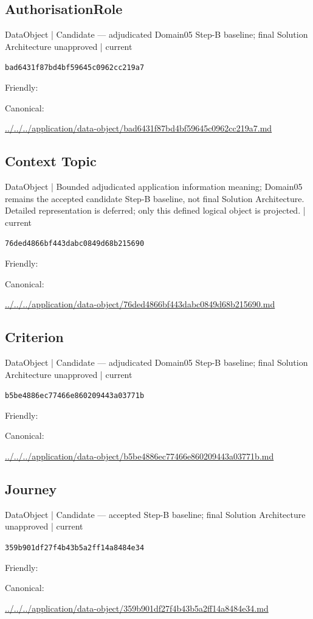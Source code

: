 \documentclass[10pt,a4paper]{article}
\begin{document}
\subsection*{AuthorisationRole}
{\small DataObject | Candidate — adjudicated Domain05 Step-B baseline; final Solution Architecture unapproved | current}\par
\texttt{bad6431f87bd4bf59645c0962cc219a7}\par
Friendly: \par
Canonical: \par
{\footnotesize\url{../../../application/data-object/bad6431f87bd4bf59645c0962cc219a7.md}}\par
\subsection*{Context Topic}
{\small DataObject | Bounded adjudicated application information meaning; Domain05 remains the accepted candidate Step-B baseline, not final Solution Architecture. Detailed representation is deferred; only this defined logical object is projected. | current}\par
\texttt{76ded4866bf443dabc0849d68b215690}\par
Friendly: \par
Canonical: \par
{\footnotesize\url{../../../application/data-object/76ded4866bf443dabc0849d68b215690.md}}\par
\subsection*{Criterion}
{\small DataObject | Candidate — adjudicated Domain05 Step-B baseline; final Solution Architecture unapproved | current}\par
\texttt{b5be4886ec77466e860209443a03771b}\par
Friendly: \par
Canonical: \par
{\footnotesize\url{../../../application/data-object/b5be4886ec77466e860209443a03771b.md}}\par
\subsection*{Journey}
{\small DataObject | Candidate — accepted Step-B baseline; final Solution Architecture unapproved | current}\par
\texttt{359b901df27f4b43b5a2ff14a8484e34}\par
Friendly: \par
Canonical: \par
{\footnotesize\url{../../../application/data-object/359b901df27f4b43b5a2ff14a8484e34.md}}\par
\end{document}
